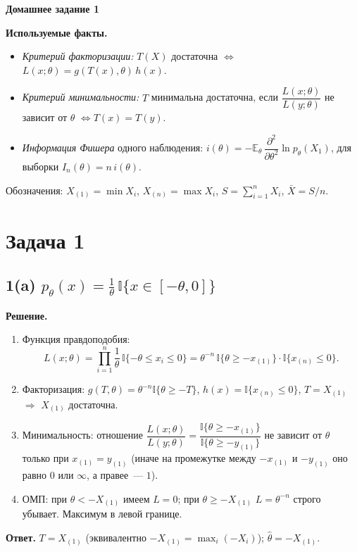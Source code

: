 \documentclass[12pt,a4paper]{article}
\newcommand{\I}{\mathbb{I}}
\newcommand{\E}{\mathbb{E}}
\newcommand{\sol}{\par\noindent\textbf{Решение.} }
\newcommand{\ans}{\par\smallskip\noindent\textbf{Ответ.} }
\begin{document}
\begin{center}
  \Large\textbf{Домашнее задание 1}
\end{center}

\noindent\textbf{Используемые факты.}
\begin{itemize}
  \item \emph{Критерий факторизации:} $T(X)$ достаточна $\iff$
        $L(x;\theta)=g(T(x),\theta)\,h(x)$.
  \item \emph{Критерий минимальности:} $T$ минимальна достаточна, если
        $\dfrac{L(x;\theta)}{L(y;\theta)}$ не зависит от $\theta$
        $\iff T(x)=T(y)$.
  \item \emph{Информация Фишера} одного наблюдения:
        $i(\theta)=-\E_\theta\,\dfrac{\partial^2}{\partial\theta^2}\ln p_\theta(X_1)$,
        для выборки $I_n(\theta)=n\,i(\theta)$.
\end{itemize}
Обозначения: $X_{(1)}=\min X_i$, $X_{(n)}=\max X_i$, $S=\sum_{i=1}^n X_i$,
$\bar X = S/n$.

\section*{Задача 1}

\subsection*{1(a) \quad $p_\theta(x)=\frac1\theta\,\I\{x\in[-\theta,0]\}$}
\sol
\begin{enumerate}
  \item Функция правдоподобия:
  \[
    L(x;\theta)=\prod_{i=1}^n\frac1\theta\,\I\{-\theta\le x_i\le 0\}
    =\theta^{-n}\,\I\{\theta\ge -x_{(1)}\}\cdot\I\{x_{(n)}\le 0\}.
  \]
  \item Факторизация: $g(T,\theta)=\theta^{-n}\I\{\theta\ge -T\}$,
        $h(x)=\I\{x_{(n)}\le0\}$, $T=X_{(1)}$ $\Rightarrow$ $X_{(1)}$ достаточна.
  \item Минимальность: отношение
  $\dfrac{L(x;\theta)}{L(y;\theta)}=\dfrac{\I\{\theta\ge -x_{(1)}\}}{\I\{\theta\ge -y_{(1)}\}}$
  не зависит от $\theta$ только при $x_{(1)}=y_{(1)}$ (иначе на промежутке
  между $-x_{(1)}$ и $-y_{(1)}$ оно равно $0$ или $\infty$, а правее~--- $1$).
  \item ОМП: при $\theta<-X_{(1)}$ имеем $L=0$; при $\theta\ge -X_{(1)}$
        $L=\theta^{-n}$ строго убывает. Максимум в левой границе.
\end{enumerate}
\ans $T=X_{(1)}$ (эквивалентно $-X_{(1)}=\max_i(-X_i)$);
\quad $\hat\theta=-X_{(1)}$.
\end{document}
